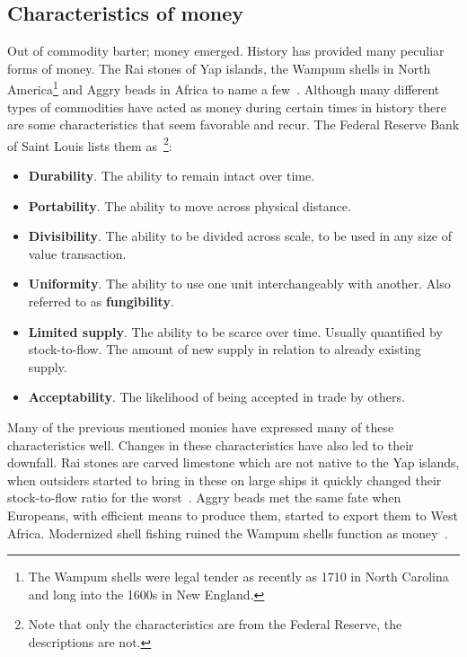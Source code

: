 \subsection{Characteristics of money}
	\label{sec:characteristics:money}

Out of commodity barter; money emerged. History has provided many peculiar forms of money. The Rai stones of Yap islands, the Wampum shells in North America\footnote{The Wampum shells were legal tender as recently as 1710 in North Carolina and long into the 1600s in New England.} and Aggry beads in Africa to name a few~\cite{szabo:shelling:out}. Although many different types of commodities have acted as money during certain times in history there are some characteristics that seem favorable and recur. The Federal Reserve Bank of Saint Louis lists them as~\cite{fed:function:money}\footnote{Note that only the characteristics are from the Federal Reserve, the descriptions are not.}:

\begin{itemize}
	\item \textbf{Durability}. The ability to remain intact over time.
	
	\item \textbf{Portability}. The ability to move across physical distance.
	
	\item \textbf{Divisibility}. The ability to be divided across scale, to be used in any size of value transaction.
	
	\item \textbf{Uniformity}. The ability to use one unit interchangeably with another. Also referred to as \textbf{fungibility}.
	
	\item \textbf{Limited supply}. The ability to be scarce over time. Usually quantified by stock-to-flow. The amount of new supply in relation to already existing supply.
	
	\item \textbf{Acceptability}. The likelihood of being accepted in trade by others.
\end{itemize}

Many of the previous mentioned monies have expressed many of these characteristics well. Changes in these characteristics have also led to their downfall. Rai stones are carved limestone which are not native to the Yap islands, when outsiders started to bring in these on large ships it quickly changed their stock-to-flow ratio for the worst~\cite{ammous:bitcoin:standard}. Aggry beads met the same fate when Europeans, with efficient means to produce them, started to export them to West Africa. Modernized shell fishing ruined the Wampum shells function as money~\cite{szabo:shelling:out}.

